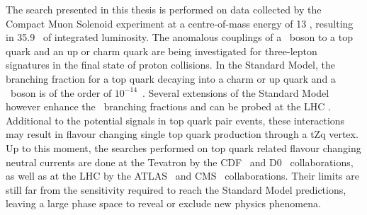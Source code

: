 


The search presented in this thesis is performed on data collected by the Compact Muon Solenoid experiment at a centre-of-mass energy of 13 \TeV, resulting in 35.9 \fbinv\ of integrated luminosity. The anomalous couplings of a \PZ\ boson to a top quark and an up or charm quark are being investigated for three-lepton signatures in the final state of proton collisions. In the Standard Model, the branching fraction for a top quark decaying into a charm or up quark and a \PZ\ boson is of the order of $10^{-14}$~\cite{AguilarSaavedra:2004wm,PhysRevD.2.1285}. Several extensions of the Standard Model however enhance the \FCNC\ branching fractions and can be probed at the LHC \cite{AguilarSaavedra:2004wm}. Additional to the potential signals in top quark pair events, these interactions may result in flavour changing single top quark production through a tZq vertex.  Up to this moment,  the searches performed on top quark related flavour changing neutral currents are done at the Tevatron by the CDF~\cite{PhysRevLett.101.192002} and D0~\cite{Abazov:2010qk} collaborations, as well as at the LHC by the ATLAS~\cite{Aad:2015uza,Aad:2015gea} and CMS~\cite{Sirunyan:2017kkr,Chatrchyan:2013nwa,Khachatryan:2015att,Sirunyan:2017kkr}  collaborations. Their limits are still far from the sensitivity required to reach the Standard Model predictions,  leaving a large phase space to reveal or exclude new physics phenomena. 


